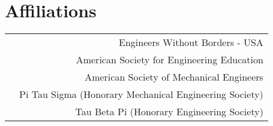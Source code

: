 \section*{Affiliations}
\begin{tabular}{L!{\VRule}R}
&Engineers Without Borders - USA\\
&American Society for Engineering Education\\
&American Society of Mechanical Engineers\\
&Pi Tau Sigma (Honorary Mechanical Engineering Society)\\
&Tau Beta Pi (Honorary Engineering Society)\\
\end{tabular}